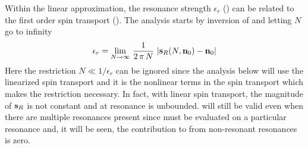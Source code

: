 Within the linear approximation, the resonance strength $\epsilon_r$ () can be related to
the first order spin transport (). The analysis starts by inversion of  and
letting $N$ go to infinity
\begin{equation}
  \epsilon_r = \lim_{N \rightarrow \infty} \, \frac{1}{2 \, \pi \, N} \, 
  \left| {\bf s}_R(N,{\bf n}_0) - {\bf n}_0 \right|
  \label{eN12n}
\end{equation}
Here the restriction $N \ll 1 / \epsilon_r$ can be ignored since the analysis below will use the
linearized spin transport and it is the nonlinear terms in the spin transport which makes the
restriction necessary. In fact, with linear spin transport, the magnitude of ${\bf s}_R$ is not
constant and at resonance is unbounded.  will still be valid even when there are multiple
resonances present since  must be evaluated on a particular resonance and, it will be
seen, the contribution to  from non-resonant resonances is zero.

